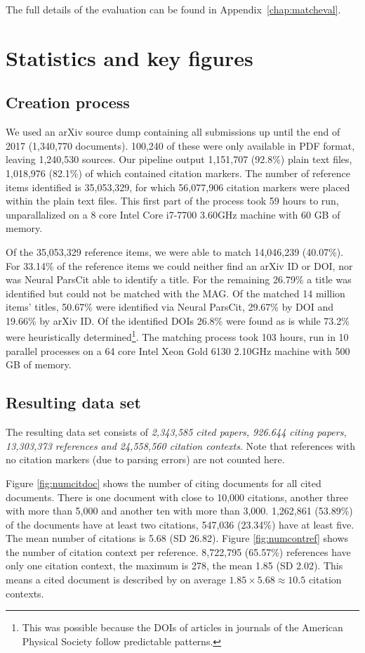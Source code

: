 The full details of the evaluation can be found in Appendix~\ref{chap:matcheval}.

\section{Statistics and key figures}

\subsection{Creation process}
We used an arXiv source dump containing all submissions up until the end of 2017 (1,340,770 documents). 100,240 of these were only available in PDF format, leaving 1,240,530 sources. Our pipeline output 1,151,707 (92.8\%) plain text files, 1,018,976 (82.1\%) of which contained citation markers. The number of reference items identified is 35,053,329, for which 56,077,906 citation markers were placed within the plain text files. This first part of the process took 59 hours to run, unparallalized on a 8 core Intel Core i7-7700 3.60GHz machine with 60 GB of memory.

Of the 35,053,329 reference items, we were able to match 14,046,239 (40.07\%). For 33.14\% of the reference items we could neither find an arXiv ID or DOI, nor was Neural ParsCit able to identify a title. For the remaining 26.79\% a title was identified but could not be matched with the MAG. Of the matched 14 million items' titles, 50.67\% were identified via Neural ParsCit, 29.67\% by DOI and 19.66\% by arXiv ID. Of the identified DOIs 26.8\% were found as is while 73.2\% were heuristically determined\footnote{This was possible because the DOIs of articles in journals of the American Physical Society follow predictable patterns.}. The matching process took 103 hours, run in 10 parallel processes on a 64 core Intel Xeon Gold 6130 2.10GHz machine with 500 GB of memory.

\subsection{Resulting data set}
The resulting data set consists of \emph{2,343,585 cited papers, 926.644 citing papers, 13,303,373 references and 24,558,560 citation contexts}. Note that references with no citation markers (due to parsing errors) are not counted here.

Figure \ref{fig:numcitdoc} shows the number of citing documents for all cited documents. There is one document with close to 10,000 citations, another three with more than 5,000 and another ten with more than 3,000. 1,262,861 (53.89\%) of the documents have at least two citations, 547,036 (23.34\%) have at least five. The mean number of citations is 5.68 (SD 26.82). Figure \ref{fig:numcontref} shows the number of citation context per reference. 8,722,795 (65.57\%) references have only one citation context, the maximum is 278, the mean 1.85 (SD 2.02). This means a cited document is described by on average $1.85 \times 5.68 \approx 10.5$ citation contexts.


